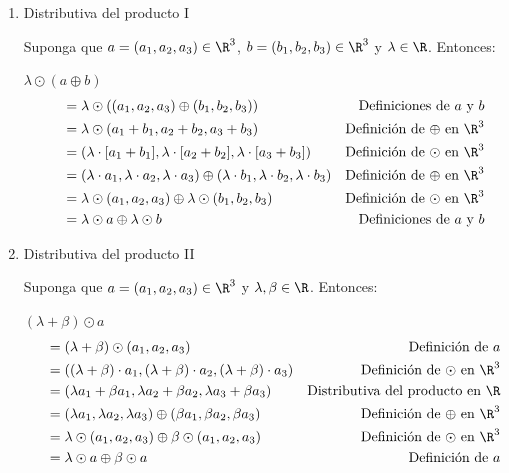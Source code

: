 \documentclass[compacto,10pt]{pubciencias-notas}
\begin{document}
\begin{ejem}
\begin{enumerate}
\item Distributiva del producto I
    
Suponga que $a=(a_1,a_2,a_3)\in \R^{3}$, $b=(b_1,b_2,b_3)\in \R^{3}$ y $\lambda\in \R$. Entonces:

$\lambda \odot (a\oplus b)$
\begin{align*}
    \phantom{abc} &= \lambda \odot ((a_1,a_2,a_3)\oplus (b_1,b_2,b_3)) & \text{Definiciones de $a$ y $b$}\\
    &= \lambda \odot (a_1+b_1,a_2+b_2,a_3+b_3) & \text{Definición de $\oplus$ en $\R^{3}$}\\
    &= (\lambda\cdot[a_1+b_1],\lambda\cdot[a_2+b_2],\lambda\cdot[a_3+b_3]) & \text{Definición de $\odot$ en $\R^{3}$}\\
    &= (\lambda\cdot a_1, \lambda\cdot a_2, \lambda\cdot a_3) \oplus (\lambda\cdot b_1, \lambda\cdot b_2, \lambda\cdot b_3) & \text{Definición de $\oplus$ en $\R^{3}$}\\
    &= \lambda \odot (a_1,a_2,a_3) \oplus \lambda \odot (b_1,b_2,b_3) & \text{Definición de $\odot$ en $\R^{3}$}\\
    &= \lambda \odot a \oplus \lambda \odot b &  \text{Definiciones de $a$ y $b$}
\end{align*}
    
\item Distributiva del producto II
    
Suponga que $a=(a_1,a_2,a_3)\in \R^{3}$ y $\lambda, \beta\in \R$. Entonces:

$(\lambda + \beta)\odot a$
\begin{align*}
    \phantom{abc} &= (\lambda + \beta)\odot (a_1, a_2, a_3) & \text{Definición de $a$}\\
    &= ((\lambda + \beta)\cdot a_1, (\lambda + \beta)\cdot a_2, (\lambda + \beta)\cdot a_3) & \text{Definición de $\odot$ en $\R^{3}$}\\
    &= (\lambda a_1 + \beta a_1, \lambda a_2 + \beta a_2, \lambda a_3 + \beta a_3) & \text{Distributiva del producto en $\R$}\\
    &= (\lambda a_1, \lambda a_2, \lambda a_3) \oplus (\beta a_1, \beta a_2, \beta a_3) & \text{Definición de $\oplus$ en $\R^{3}$}\\
    &= \lambda \odot (a_1, a_2, a_3) \oplus \beta\odot (a_1,a_2,a_3) & \text{Definición de $\odot$ en $\R^{3}$}\\
    &= \lambda \odot a \oplus \beta \odot a & \text{Definición de $a$}
\end{align*}
    

\end{enumerate}
\end{ejem}
\end{document}
